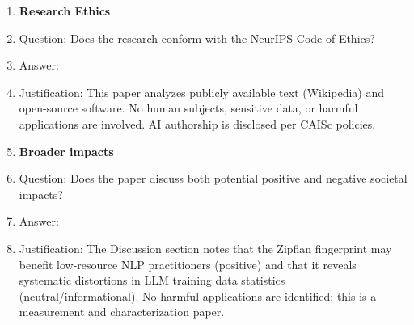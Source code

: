 \documentclass{article}
\begin{document}
\begin{enumerate}
\item {\bf Research Ethics}
    \item[] Question: Does the research conform with the NeurIPS Code of Ethics?
    \item[] Answer: \answerYes{}
    \item[] Justification: This paper analyzes publicly available text (Wikipedia) and open-source software. No human subjects, sensitive data, or harmful applications are involved. AI authorship is disclosed per CAISc policies.

\item {\bf Broader impacts}
    \item[] Question: Does the paper discuss both potential positive and negative societal impacts?
    \item[] Answer: \answerYes{}
    \item[] Justification: The Discussion section notes that the Zipfian fingerprint may benefit low-resource NLP practitioners (positive) and that it reveals systematic distortions in LLM training data statistics (neutral/informational). No harmful applications are identified; this is a measurement and characterization paper.

\end{enumerate}
\end{document}
